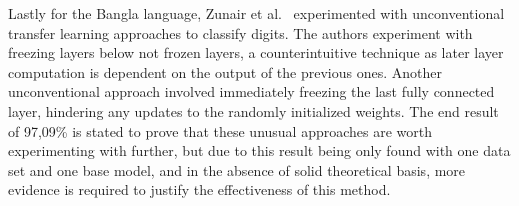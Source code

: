 \documentclass[english,twoside,openright]{UH_DS_MSc}
\begin{document}



Lastly for the Bangla language, Zunair et al.~\cite{11zunairUnconventionalWisdom} experimented 
with unconventional transfer learning approaches to classify digits.
The authors experiment with freezing layers below not frozen layers, a counterintuitive 
technique as later layer computation is dependent on the output of the previous ones.
Another unconventional approach involved immediately freezing the last fully connected layer, 
hindering any updates to the randomly initialized weights. The end result of 97,09\% is stated 
to prove that these unusual approaches are worth experimenting with further, but due to this 
result being only found with one data set and one base model, and in the absence of solid 
theoretical basis, more evidence is required to justify the effectiveness of this method.


\end{document}
